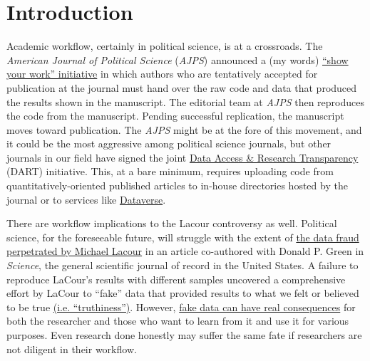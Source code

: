\documentclass[11pt,]{article}
\begin{document}
\hypertarget{introduction}{%
\section{Introduction}\label{introduction}}

Academic workflow, certainly in political science, is at a crossroads.
The \emph{American Journal of Political Science} (\emph{AJPS}) announced
a (my words)
\href{http://ajps.org/2015/03/26/the-ajps-replication-policy-innovations-and-revisions/}{``show
your work'' initiative} in which authors who are tentatively accepted
for publication at the journal must hand over the raw code and data that
produced the results shown in the manuscript. The editorial team at
\emph{AJPS} then reproduces the code from the manuscript. Pending
successful replication, the manuscript moves toward publication. The
\emph{AJPS} might be at the fore of this movement, and it could be the
most aggressive among political science journals, but other journals in
our field have signed the joint
\href{http://www.dartstatement.org/}{Data Access \& Research
Transparency} (DART) initiative. This, at a bare minimum, requires
uploading code from quantitatively-oriented published articles to
in-house directories hosted by the journal or to services like
\href{http://dataverse.org/}{Dataverse}.

There are workflow implications to the Lacour controversy as well.
Political science, for the foreseeable future, will struggle with the
extent of
\href{http://stanford.edu/~dbroock/broockman_kalla_aronow_lg_irregularities.pdf}{the
data fraud perpetrated by Michael Lacour} in an article co-authored with
Donald P. Green in \emph{Science}, the general scientific journal of
record in the United States. A failure to reproduce LaCour's results
with different samples uncovered a comprehensive effort by LaCour to
``fake'' data that provided results to what we felt or believed to be
true \href{http://chronicle.com/article/LAffaire-LaCour/230905/}{(i.e.
``truthiness'')}. However,
\href{http://kieranhealy.org/blog/archives/2015/05/20/fake-science-real-consequences/}{fake
data can have real consequences} for both the researcher and those who
want to learn from it and use it for various purposes. Even research
done honestly may suffer the same fate if researchers are not diligent
in their workflow.
\end{document}
